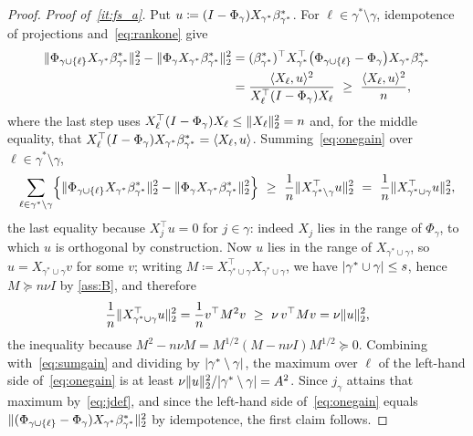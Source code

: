 \begin{proof}
    \emph{Proof of~\ref{it:fs_a}.} Put $u\coloneq(I-\Phi_\gamma)X_{\gamma^{\ast}}\beta^{\ast}_{\gamma^{\ast}}$.
    For $\ell\in\gamma^{\ast}\setminus\gamma$, idempotence of projections
    and~\eqref{eq:rankone} give
    \begin{align}
        \notag
        \lVert\Phi_{\gamma\cup\{\ell\}}X_{\gamma^{\ast}}\beta^{\ast}_{\gamma^{\ast}}\rVert_2^{2}
        -\lVert\Phi_{\gamma}X_{\gamma^{\ast}}\beta^{\ast}_{\gamma^{\ast}}\rVert_2^{2}
        &=(\beta^\ast_{\gamma^{\ast}})^{\top}
        X_{\gamma^{\ast}}^{\top}
        \bigl(\Phi_{\gamma\cup\{\ell\}}-\Phi_\gamma\bigr)X_{\gamma^{\ast}}\beta^{\ast}_{\gamma^{\ast}}\\
        \label{eq:onegain}
        &=\frac{\langle X_\ell,u\rangle^{2}}
        {X_\ell^{\top}(I-\Phi_\gamma)X_\ell}
        \ \geq\ \frac{\langle X_\ell,u\rangle^{2}}{n},
    \end{align}
    where the last step uses
    $X_\ell^{\top}(I-\Phi_\gamma)X_\ell\leq\lVert X_\ell\rVert_2^{2}=n$ and,
    for the middle equality, that
    $X_\ell^{\top}(I-\Phi_\gamma)X_{\gamma^{\ast}}\beta^{\ast}_{\gamma^{\ast}}=\langle X_\ell,u\rangle$.
    Summing~\eqref{eq:onegain} over $\ell\in\gamma^{\ast}\setminus\gamma$,
    \begin{equation}
        \label{eq:sumgain}
        \sum_{\ell\in\gamma^{\ast}\setminus\gamma}
        \Bigl\{\norm{\Phi_{\gamma\cup\{\ell\}}\signal}_2^{2}
        -\norm{\Phi_{\gamma}\signal}_2^{2}\Bigr\}
        \ \geq\ \frac1n
        \norm{X_{\gamma^{\ast}\setminus\gamma}^{\top}u}_2^{2}
        \ =\ \frac1n\norm{X_{\gamma^{\ast}\cup\gamma}^{\top}u}_2^{2},
    \end{equation}
    the last equality because $X_j^{\top}u=0$ for $j\in\gamma$: indeed
    $X_j$ lies in the range of $\Phi_\gamma$, to which $u$ is orthogonal
    by construction. Now $u$ lies in the range of
    $X_{\gamma^{\ast}\cup\gamma}$, so $u=X_{\gamma^{\ast}\cup\gamma}v$ for
    some $v$; writing
    $M\coloneq X_{\gamma^{\ast}\cup\gamma}^{\top}
    X_{\gamma^{\ast}\cup\gamma}$, we have
    $\lvert\gamma^{\ast}\cup\gamma\rvert\leq s$, hence $M\succcurlyeq n\nu I$ by
    \cref{ass:B}, and therefore
    \begin{equation*}
        \frac1n\lVert X_{\gamma^{\ast}\cup\gamma}^{\top}u\rVert_2^{2}
        =\frac1nv^{\top}M^{2}v
        \ \geq\ \nu\,v^{\top}Mv
        =\nu\lVert u\rVert_2^{2},
    \end{equation*}
    the inequality because $M^{2}-n\nu M=M^{1/2}(M-n\nu I)M^{1/2}
    \succcurlyeq0$. Combining with~\eqref{eq:sumgain} and dividing by
    $\lvert\gamma^{\ast}\setminus\gamma\rvert$, the maximum over $\ell$ of the
    left-hand side of~\eqref{eq:onegain} is at least
    $\nu\lVert u\rVert_2^{2}/\lvert\gamma^{\ast}\setminus\gamma\rvert=A^{2}$. Since
    $j_\gamma$ attains that maximum by~\eqref{eq:jdef}, and since the
    left-hand side of~\eqref{eq:onegain} equals
    $\lVert(\Phi_{\gamma\cup\{\ell\}}-\Phi_\gamma)X_{\gamma^{\ast}}\beta^{\ast}_{\gamma^{\ast}}\rVert_2^{2}$ by
    idempotence, the first claim follows.


\end{proof}
